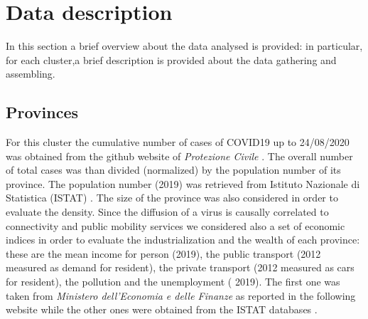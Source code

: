 \documentclass[
12pt, %
a4paper, %
oneside, %
headinclude,footinclude, %
BCOR5mm, %
]{scrartcl}
\begin{document}
\section{Data description} \label{Data_description}
In this section a brief overview about the data analysed is provided: in particular, for each cluster,a brief description is provided  about the data gathering and assembling. 

\subsection{Provinces}
For this cluster the cumulative number of cases of COVID19 up to 24/08/2020 was obtained from the github website of \textit{Protezione Civile} \cite{github-protezionecivile}. The overall number of total cases was than divided (normalized) by the population number of its province. The population number (2019) was retrieved from Istituto Nazionale di Statistica (ISTAT) \cite{ISTAT}. The size of the province was also considered in order to evaluate the density. Since the diffusion of a virus is causally correlated to connectivity and public mobility services \cite{lloyd2001viruses,kraemer2020effect} we considered also a set of economic indices in order to evaluate the industrialization and the wealth of each province: these are the mean income for person (2019), the public transport (2012 measured as demand for resident), the private transport (2012 measured as cars for resident), the pollution and the unemployment ( 2019). The first one was taken from \textit{Ministero dell'Economia e delle Finanze} as reported in the following website \cite{MEF} while the other ones were obtained from the ISTAT databases \cite{ISTAT}.
\end{document}
